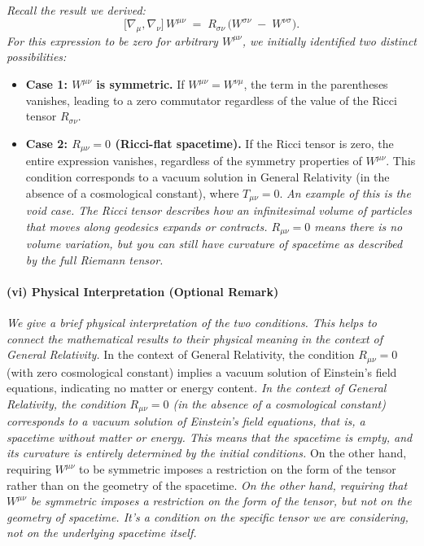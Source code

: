 \textit{Recall the result we derived:}
\[
\bigl[\nabla_{\mu}, \nabla_{\nu}\bigr]\,W^{\mu\nu} \;=\;
R_{\sigma\nu}\,\bigl(W^{\sigma\nu} \;-\; W^{\nu\sigma}\bigr).
\]
\textit{For this expression to be zero for arbitrary \(W^{\mu\nu}\), we initially identified two distinct possibilities:}

\begin{itemize}
    \item \textbf{Case 1: $W^{\mu\nu}$ is symmetric.} If $W^{\mu\nu} = W^{\nu\mu}$, the term in the parentheses vanishes, leading to a zero commutator regardless of the value of the Ricci tensor \(R_{\sigma\nu}\).

    \item \textbf{Case 2: $R_{\mu\nu} = 0$ (Ricci-flat spacetime).} If the Ricci tensor is zero, the entire expression vanishes, regardless of the symmetry properties of \(W^{\mu\nu}\). This condition corresponds to a vacuum solution in General Relativity (in the absence of a cosmological constant), where \(T_{\mu\nu} = 0\).  \textit{An example of this is the void case. The Ricci tensor describes how an infinitesimal volume of particles that moves along geodesics expands or contracts. \(R_{\mu\nu} = 0\) means there is no volume variation, but you can still have curvature of spacetime as described by the full Riemann tensor.}
\end{itemize}


\paragraph{(vi) Physical Interpretation (Optional Remark)}
\textit{We give a brief physical interpretation of the two conditions. This helps to connect the mathematical results to their physical meaning in the context of General Relativity.}
In the context of General Relativity, the condition $R_{\mu\nu}=0$ (with zero cosmological constant) implies a vacuum solution of Einstein's field equations, indicating no matter or energy content.
\textit{In the context of General Relativity, the condition \(R_{\mu\nu}=0\) (in the absence of a cosmological constant) corresponds to a vacuum solution of Einstein's field equations, that is, a spacetime without matter or energy. This means that the spacetime is empty, and its curvature is entirely determined by the initial conditions.}
On the other hand, requiring $W^{\mu\nu}$ to be symmetric imposes a restriction on the form of the tensor rather than on the geometry of the spacetime.
\textit{On the other hand, requiring that \(W^{\mu\nu}\) be symmetric imposes a restriction on the form of the tensor, but not on the geometry of spacetime. It's a condition on the specific tensor we are considering, not on the underlying spacetime itself.}

